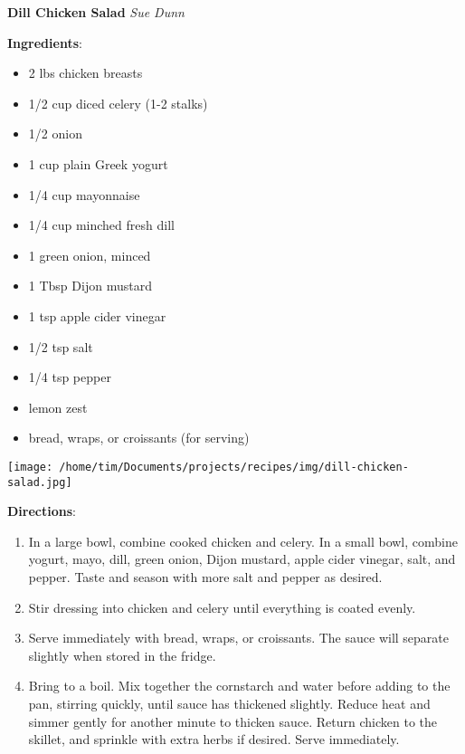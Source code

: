 \documentclass[11pt, twoside, openany]{book}
\begin{document}
\noindent\begin{minipage}[t]{\linewidth}%
{\Large\textbf{Dill Chicken Salad}} \label{dill-chicken-salad}\hfill\textit{Sue Dunn}\\
\noindent\begin{minipage}[t]{0.78\linewidth}%
\textbf{Ingredients}:\vspace{-3mm}
\begin{multicols}{2}
\begin{itemize}\setlength\itemsep{-1mm}
\item 2 lbs chicken breasts
\item 1/2 cup diced celery (1-2 stalks)
\item 1/2 onion
\item 1 cup plain Greek yogurt
\item 1/4 cup mayonnaise
\item 1/4 cup minched fresh dill
\item 1 green onion, minced
\item 1 Tbsp Dijon mustard
\item 1 tsp apple cider vinegar
\item 1/2 tsp salt
\item 1/4 tsp pepper
\item lemon zest
\item bread, wraps, or croissants (for serving)
\end{itemize}
\end{multicols}
\end{minipage}
\noindent\begin{minipage}[t]{0.18\linewidth}
\centering \strut\vspace*{-\baselineskip}\newline
\texttt{[image: /home/tim/Documents/projects/recipes/img/dill-chicken-salad.jpg]}\\
\end{minipage}\vspace{3mm}
\textbf{Directions}:
\vspace{-3mm}\begin{enumerate}\setlength\itemsep{-1mm}
\item In a large bowl, combine cooked chicken and celery. In a small bowl, combine yogurt, mayo, dill, green onion, Dijon mustard, apple cider vinegar, salt, and pepper. Taste and season with more salt and pepper as desired.
\item Stir dressing into chicken and celery until everything is coated evenly.
\item Serve immediately with bread, wraps, or croissants. The sauce will separate slightly when stored in the fridge.
\item Bring to a boil. Mix together the cornstarch and water before adding to the pan, stirring quickly, until sauce has thickened slightly. Reduce heat and simmer gently for another minute to thicken sauce. Return chicken to the skillet, and sprinkle with extra herbs if desired. Serve immediately.
\end{enumerate}
\end{minipage}\vspace{8mm}
\end{document}
